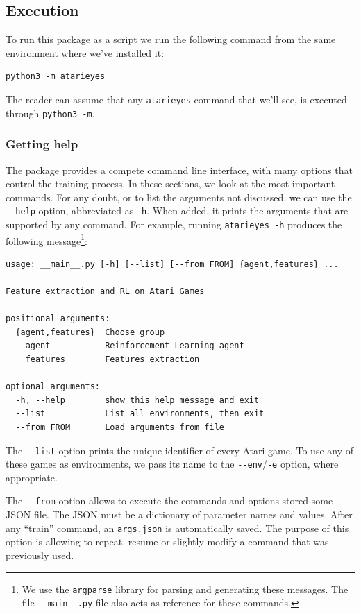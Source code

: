 \subsection{Execution}

To run this package as a script we run the following command from the same
environment where we've installed it:
\begin{verbatim}
python3 -m atarieyes
\end{verbatim}
The reader can assume that any \texttt{atarieyes} command that we'll see, is
executed through \verb|python3 -m|.

\subsubsection*{Getting help}

The package provides a compete command line interface, with many options that
control the training process. In these sections, we look at the most important
commands. For any doubt, or to list the arguments not discussed, we can use
the \verb|--help| option, abbreviated as \verb|-h|. When added, it prints the
arguments that are supported by any command. For example, running
\verb|atarieyes -h| produces the following message\footnote{We use the
\texttt{argparse} library for parsing and generating these messages. The file
\texttt{\_\_main\_\_.py} file also acts as reference for these commands.}:
\begin{verbatim}
usage: __main__.py [-h] [--list] [--from FROM] {agent,features} ...

Feature extraction and RL on Atari Games

positional arguments:
  {agent,features}  Choose group
    agent           Reinforcement Learning agent
    features        Features extraction

optional arguments:
  -h, --help        show this help message and exit
  --list            List all environments, then exit
  --from FROM       Load arguments from file
\end{verbatim}

The \verb|--list| option prints the unique identifier of every Atari game. To
use any of these games as environments, we pass its name to the
\verb|--env|/\texttt{-e} option, where appropriate.

The \verb|--from| option allows to execute the commands and options stored
some JSON file. The JSON must be a dictionary of parameter names and values.
After any ``train'' command, an \verb|args.json| is automatically saved. The
purpose of this option is allowing to repeat, resume or slightly modify a
command that was previously used.

